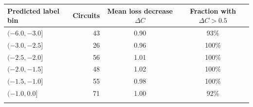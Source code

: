 \begin{tabular}{lrcc}
\toprule
Predicted label bin & Circuits & Mean loss decrease $\Delta C$ & Fraction with $\Delta C>0.5$ \\
\midrule
$(-6.0, -3.0]$ & 43 & 0.90 & 93\% \\
$(-3.0, -2.5]$ & 26 & 0.96 & 100\% \\
$(-2.5, -2.0]$ & 56 & 1.01 & 100\% \\
$(-2.0, -1.5]$ & 48 & 1.02 & 100\% \\
$(-1.5, -1.0]$ & 55 & 0.98 & 100\% \\
$(-1.0, 0.0]$ & 71 & 1.00 & 92\% \\
\botrule
\end{tabular}
